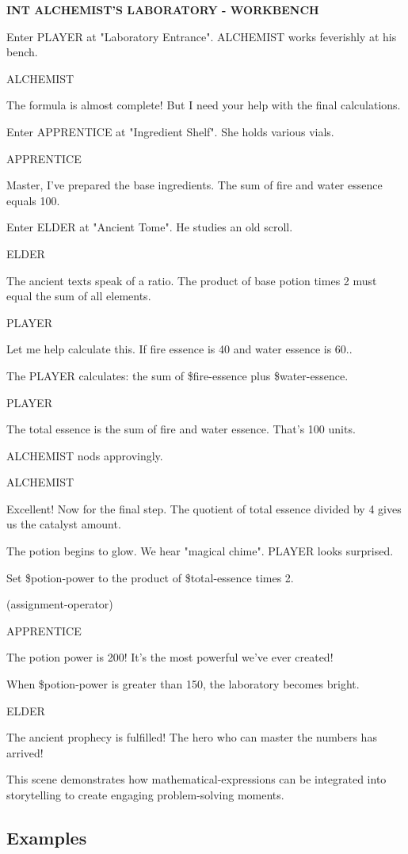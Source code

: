 \documentclass[11pt,letterpaper,oldstylefigures]{memoir}
\newcommand{\slugline}[1]{\nobreak\textbf{\MakeUppercase{#1}}\par\nobreak\vspace{1\baselineskip}}
\newcommand{\speaker}[1]{\nobreak\hspace*{0.333\textwidth}\MakeUppercase{#1}\par\nobreak\vspace{0.5\baselineskip}}
\newcommand{\dialogue}[1]{\nobreak\hspace*{0.25\textwidth}\begin{minipage}{0.5\textwidth}#1\end{minipage}\par\vspace{1\baselineskip}}
\newcommand{\stagedir}[1]{#1\par\vspace{1\baselineskip}}
\newenvironment{FountainExample}
  {\begingroup
  \ttfamily\small
   \setlength{\parindent}{0pt}
  \setlength{\parskip}{0.5em}
  \allowdisplaybreaks
  \setlength{\displaywidowpenalty}{0}
  \setlength{\widowpenalty}{0}
  \setlength{\clubpenalty}{0}
  \setlength{\interlinepenalty}{0}
}
  {\endgroup}
\begin{document}
\begin{FountainExample}
\slugline{INT ALCHEMIST'S LABORATORY - WORKBENCH}

\stagedir{Enter PLAYER at "Laboratory Entrance". ALCHEMIST works feverishly at his bench.}

\speaker{ALCHEMIST}
\dialogue{The formula is almost complete! But I need your help with the final calculations.}

\stagedir{Enter APPRENTICE at "Ingredient Shelf". She holds various vials.}

\speaker{APPRENTICE}
\dialogue{Master, I've prepared the base ingredients. The sum of fire and water essence equals 100.}

\stagedir{Enter ELDER at "Ancient Tome". He studies an old scroll.}

\speaker{ELDER}
\dialogue{The ancient texts speak of a ratio. The product of base potion times 2 must equal the sum of all elements.}

\speaker{PLAYER}
\dialogue{Let me help calculate this. If fire essence is 40 and water essence is 60..}

\stagedir{The PLAYER calculates: the sum of \$fire-essence plus \$water-essence.}

\speaker{PLAYER}
\dialogue{The total essence is the sum of fire and water essence. That's 100 units.}

\stagedir{ALCHEMIST nods approvingly.}

\speaker{ALCHEMIST}
\dialogue{Excellent! Now for the final step. The quotient of total essence divided by 4 gives us the catalyst amount.}

\stagedir{The potion begins to glow. We hear "magical chime". PLAYER looks surprised.}
\stagedir{Set \$potion-power to the product of \$total-essence times 2.} (\gls{assignment-operator})

\speaker{APPRENTICE}
\dialogue{The potion power is 200! It's the most powerful we've ever created!}

\stagedir{When \$potion-power is greater than 150, the laboratory becomes bright.}

\speaker{ELDER}
\dialogue{The ancient prophecy is fulfilled! The hero who can master the numbers has arrived!}
\end{FountainExample}

This scene demonstrates how \gls{mathematical-expression}s can be integrated into storytelling to create engaging problem-solving moments.

\subsection{Examples}
\end{document}
